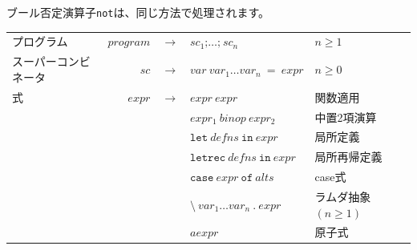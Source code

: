 \documentclass{jbook}
\begin{document}
ブール否定演算子\texttt{not}は、同じ方法で処理されます。

\begin{center}
	\begin{tabular} {|l r c l l|} \hline
		プログラム           & $program$ & $\rightarrow$ & $sc_1 \texttt{;} \ldots \texttt{;} ~ sc_n$                                                                                                                       & $n \geq 1$              \\
		スーパーコンビネータ & $sc$      & $\rightarrow$ & $var ~ var_1 \ldots var_n ~ = ~ expr$                                                                                                                            & $n \geq 0$              \\
		式                   & $expr$    & $\rightarrow$ & $expr ~ expr$                                                                                                                                                    & 関数適用                \\
		                     &           & \textbar      & $expr_1 ~ binop ~ expr_2$                                                                                                                                        & 中置2項演算             \\
		                     &           & \textbar      & $\texttt{let} ~ defns ~ \texttt{in} ~ expr$                                                                                                                      & 局所定義                \\
		                     &           & \textbar      & $\texttt{letrec} ~ defns ~ \texttt{in} ~ expr$                                                                                                                   & 局所再帰定義            \\
		                     &           & \textbar      & $\texttt{case} ~ expr ~ \texttt{of} ~ alts$                                                                                                                      & case式                  \\
		                     &           & \textbar      & $\texttt{\textbackslash} ~ var_1 \ldots var_n ~ \texttt{.} ~ expr$                                                                                               & ラムダ抽象 $(n \geq 1)$ \\
		                     &           & \textbar      & $aexpr$                                                                                                                                                          & 原子式                  \\

\end{tabular}
\end{center}
\end{document}
